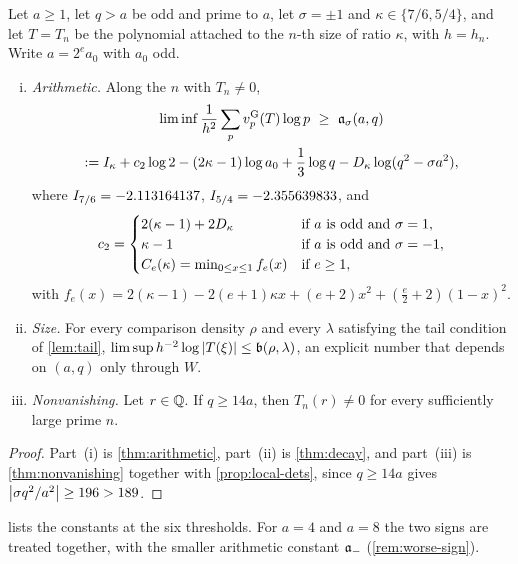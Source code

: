 \begin{theorem}\label{thm:three-estimates}
Let $a\ge1$, let $q>a$ be odd and prime to $a$, let $\sigma=\pm1$ and $\kappa\in\{7/6,5/4\}$,
and let $T=T_n$ be the polynomial attached to the $n$-th size of ratio $\kappa$, with $h=h_n$.
Write $a=2^ea_0$ with $a_0$ odd.
\begin{enumerate}[(i)]
\item \emph{Arithmetic.} Along the $n$ with $T_n\ne0$,
\begin{multline*}
  \liminf\frac{1}{h^2}\sum_pv_{p}^{\mathrm{G}}(T)\log p\ \ge\ \mathfrak{a}_\sigma(a,q)\\
  :=I_\kappa+c_2\log2-(2\kappa-1)\log a_0+\frac13\log q-D_\kappa\log(q^2-\sigma a^2),
\end{multline*}
where $I_{7/6}=-2.113164137$, $I_{5/4}=-2.355639833$, and
\[
  c_2=\begin{cases}2(\kappa-1)+2D_\kappa&\text{if $a$ is odd and }\sigma=1,\\
  \kappa-1&\text{if $a$ is odd and }\sigma=-1,\\
  C_e(\kappa)=\min_{0\le x\le1}f_e(x)&\text{if }e\ge1,\end{cases}
\]
with $f_e(x)=2(\kappa-1)-2(e+1)\kappa x+(e+2)x^2+(\frac e2+2)(1-x)^2$.
\item \emph{Size.} For every comparison density $\rho$ and every $\lambda$ satisfying the tail
condition of \cref{lem:tail}, $\limsup h^{-2}\log\left\lvert T(\xi)\right\rvert\le\mathfrak{b}(\rho,\lambda)$, an
explicit number that depends on $(a,q)$ only through $W$.
\item \emph{Nonvanishing.} Let $r\in\mathbb{Q}$. If $q\ge14a$, then $T_n(r)\ne0$ for every
sufficiently large prime $n$.
\end{enumerate}
\end{theorem}

\begin{proof}
Part~(i) is \cref{thm:arithmetic}, part~(ii) is \cref{thm:decay}, and part~(iii) is
\cref{thm:nonvanishing} together with \cref{prop:local-dets}, since $q\ge14a$ gives
$\left\lvert \sigma q^2/a^2\right\rvert\ge196>189$.
\end{proof}

 lists the constants at the six thresholds. For $a=4$ and $a=8$ the two
signs are treated together, with the smaller arithmetic constant $\mathfrak{a}_-$
(\cref{rem:worse-sign}).

